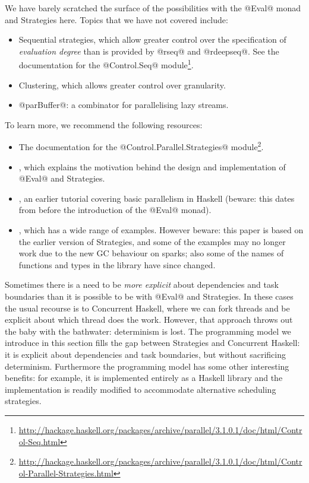 
We have barely scratched the surface of the possibilities with the
@Eval@ monad and Strategies here.  Topics that we have not covered
include:

\begin{itemize}
\item Sequential strategies, which allow greater control over the
  specification of \emph{evaluation degree} than is provided by @rseq@
  and @rdeepseq@.  See the documentation for the @Control.Seq@ module\footnote{\url{http://hackage.haskell.org/packages/archive/parallel/3.1.0.1/doc/html/Control-Seq.html}}.
\item Clustering, which allows greater control over granularity.
\item @parBuffer@: a combinator for parallelising lazy streams.
\end{itemize}

To learn more, we recommend the following resources:

\begin{itemize}
\item The documentation for the @Control.Parallel.Strategies@ module\footnote{\url{http://hackage.haskell.org/packages/archive/parallel/3.1.0.1/doc/html/Control-Parallel-Strategies.html}}.
\item \citet{seq-no-more}, which explains the motivation behind the
  design and implementation of @Eval@ and Strategies.
\item \citet{pjsingh-tutorial}, an earlier tutorial covering
  basic parallelism in Haskell (beware: this dates from before the
  introduction of the @Eval@ monad).
\item \citet{trinder:strategies}, which has a wide range of examples.
  However beware: this paper is based on the earlier version of
  Strategies, and some of the examples may no longer work due to the
  new GC behaviour on sparks; also some of the names of functions and
  types in the library have since changed.
\end{itemize}


Sometimes there is a need to be \emph{more explicit} about
dependencies and task boundaries than it is possible to be with @Eval@
and Strategies.  In these cases the usual recourse is to Concurrent
Haskell, where we can fork threads and be explicit about which thread
does the work.  However, that approach throws out the baby with the
bathwater: determinism is lost.  The programming model we introduce in
this section fills the gap between Strategies and Concurrent Haskell:
it is explicit about dependencies and task boundaries, but without
sacrificing determinism.  Furthermore the programming model has some
other interesting benefits: for example, it is implemented entirely as
a Haskell library and the implementation is readily modified to
accommodate alternative scheduling strategies.

